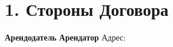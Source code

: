 \section*{1. Стороны Договора}
\textbf{Арендодатель}
\ContractLandlordsRU
\vspace{0.5cm}
\textbf{Арендатор}
\ContractTenantsRU
Адрес: \Propaddress
